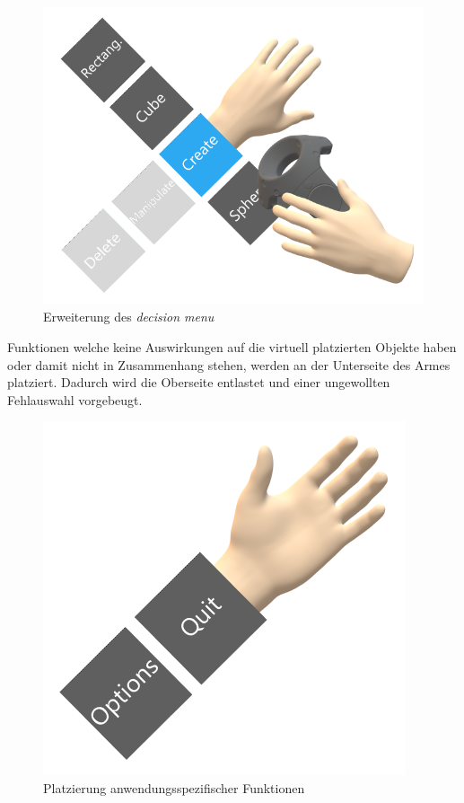 \begin{figure}[h]
\captionsetup{width=.7\linewidth}
\includegraphics[scale=0.5]{Bilder/Hauptteil/konzept23}
\centering
\caption{Erweiterung des \textit{decision menu}}
\label{fig:decisionmenu2}
\end{figure}

\noindent Funktionen welche keine Auswirkungen auf die virtuell platzierten Objekte haben oder damit nicht in Zusammenhang stehen, werden an der Unterseite des Armes platziert. Dadurch wird die Oberseite entlastet und einer ungewollten Fehlauswahl vorgebeugt. 

\begin{figure}[h]
\captionsetup{width=.7\linewidth}
\includegraphics[scale=0.5]{Bilder/Hauptteil/konzept22}
\centering
\caption{Platzierung anwendungsspezifischer Funktionen}
\label{fig:decisionmenu3}
\end{figure}

